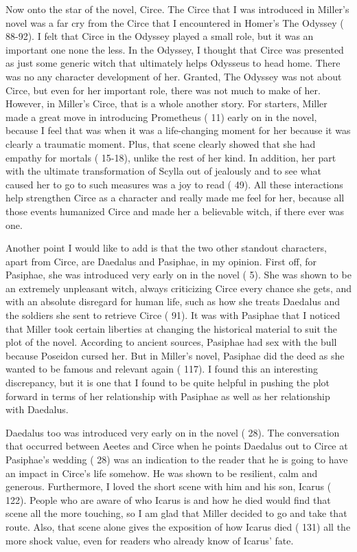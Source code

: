 \documentclass[12pt, a4paper]{article}
\begin{document}
Now onto the star of the novel, Circe. The Circe that I was introduced in Miller's novel was a far cry from the Circe that I encountered in Homer's The Odyssey (\cite{homer_odyssey_1998} 88-92). I felt that Circe in the Odyssey played a small role, but it was an important one none the less. In the Odyssey, I thought that Circe was presented as just some generic witch that ultimately helps Odysseus to head home. There was no any character development of her. Granted, The Odyssey was not about Circe, but even for her important role, there was not much to make of her. However, in Miller's Circe, that is a whole another story. For starters, Miller made a great move in introducing Prometheus (\cite{miller_circe_2018} 11) early on in the novel, because I feel that was when it was a life-changing moment for her because it was clearly a traumatic moment. Plus, that scene clearly showed that she had empathy for mortals (\cite{miller_circe_2018} 15-18), unlike the rest of her kind. In addition, her part with the ultimate transformation of Scylla out of jealously  and to see what caused her to go to such measures was a joy to read (\cite{miller_circe_2018} 49). All these interactions help strengthen Circe as a character and really made me feel for her, because all those events humanized Circe and made her a believable witch, if there ever was one.

Another point I would like to add is that the two other standout characters, apart from Circe, are Daedalus and Pasiphae, in my opinion. First off, for Pasiphae, she was introduced very early on in the novel (\cite{miller_circe_2018} 5). She was shown to be an extremely unpleasant witch, always criticizing Circe every chance she gets, and with an absolute disregard for human life, such as how she treats Daedalus and the soldiers she sent to retrieve Circe (\cite{miller_circe_2018} 91). It was with Pasiphae that I noticed that Miller took certain liberties at changing the historical material to suit the plot of the novel. According to ancient sources, Pasiphae had sex with the bull because Poseidon cursed her. But in Miller's novel, Pasiphae did the deed as she wanted to be famous and relevant again (\cite{miller_circe_2018} 117). I found this an interesting discrepancy, but it is one that I found to be quite helpful in pushing the plot forward in terms of her relationship with Pasiphae as well as her relationship with Daedalus.

Daedalus too was introduced very early on in the novel (\cite{miller_circe_2018} 28). The conversation that occurred between Aeetes and Circe when he points Daedalus out to Circe at Pasiphae's wedding (\cite{miller_circe_2018} 28) was an indication to the reader that he is going to have an impact in Circe's life somehow. He was shown to be resilient, calm and generous. Furthermore, I loved the short scene with him and his son, Icarus (\cite{miller_circe_2018} 122). People who are aware of who Icarus is and how he died would find that scene all the more touching, so I am glad that Miller decided to go and take that route. Also, that scene alone gives the exposition of how Icarus died (\cite{miller_circe_2018} 131) all the more shock value, even for readers who already know of Icarus' fate.
\end{document}

